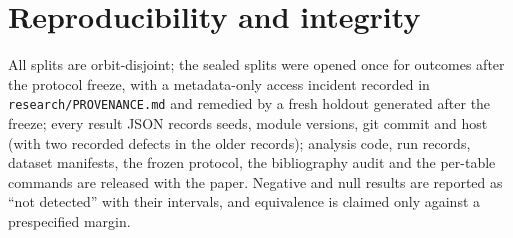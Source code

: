 \documentclass{neurips_2024}
\begin{document}
\section{Reproducibility and integrity}
\label{sec:repro}

All splits are orbit-disjoint; the sealed splits were opened once for outcomes after the
protocol freeze, with a metadata-only access incident recorded in
\texttt{research/PROVENANCE.md} and remedied by a fresh holdout generated after the freeze;
every result JSON records seeds, module versions, git commit and host (with two recorded
defects in the older records); analysis code, run records, dataset manifests, the frozen
protocol, the bibliography audit and the per-table commands are released with the paper.
Negative and null results are reported as ``not detected'' with their intervals, and
equivalence is claimed only against a prespecified margin.
\end{document}
